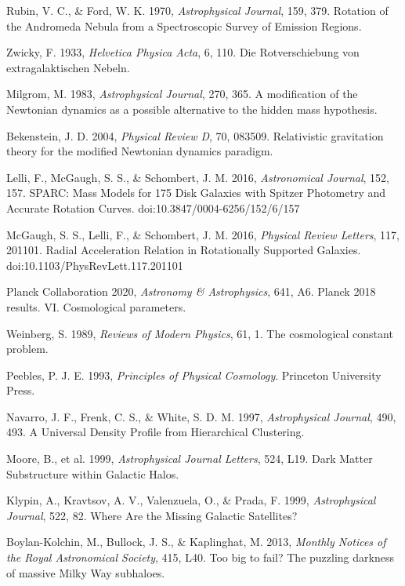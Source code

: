 \documentclass[12pt,a4paper]{article}
\begin{document}
\begin{thebibliography}{99}

 Rubin, V. C., \& Ford, W. K. 1970, \textit{Astrophysical Journal}, 159, 379. Rotation of the Andromeda Nebula from a Spectroscopic Survey of Emission Regions.

 Zwicky, F. 1933, \textit{Helvetica Physica Acta}, 6, 110. Die Rotverschiebung von extragalaktischen Nebeln.

 Milgrom, M. 1983, \textit{Astrophysical Journal}, 270, 365. A modification of the Newtonian dynamics as a possible alternative to the hidden mass hypothesis.

 Bekenstein, J. D. 2004, \textit{Physical Review D}, 70, 083509. Relativistic gravitation theory for the modified Newtonian dynamics paradigm.

 Lelli, F., McGaugh, S. S., \& Schombert, J. M. 2016, \textit{Astronomical Journal}, 152, 157. SPARC: Mass Models for 175 Disk Galaxies with Spitzer Photometry and Accurate Rotation Curves. doi:10.3847/0004-6256/152/6/157

 McGaugh, S. S., Lelli, F., \& Schombert, J. M. 2016, \textit{Physical Review Letters}, 117, 201101. Radial Acceleration Relation in Rotationally Supported Galaxies. doi:10.1103/PhysRevLett.117.201101

 Planck Collaboration 2020, \textit{Astronomy \& Astrophysics}, 641, A6. Planck 2018 results. VI. Cosmological parameters.

 Weinberg, S. 1989, \textit{Reviews of Modern Physics}, 61, 1. The cosmological constant problem.

 Peebles, P. J. E. 1993, \textit{Principles of Physical Cosmology}. Princeton University Press.

 Navarro, J. F., Frenk, C. S., \& White, S. D. M. 1997, \textit{Astrophysical Journal}, 490, 493. A Universal Density Profile from Hierarchical Clustering.

 Moore, B., et al. 1999, \textit{Astrophysical Journal Letters}, 524, L19. Dark Matter Substructure within Galactic Halos.

 Klypin, A., Kravtsov, A. V., Valenzuela, O., \& Prada, F. 1999, \textit{Astrophysical Journal}, 522, 82. Where Are the Missing Galactic Satellites?

 Boylan-Kolchin, M., Bullock, J. S., \& Kaplinghat, M. 2013, \textit{Monthly Notices of the Royal Astronomical Society}, 415, L40. Too big to fail? The puzzling darkness of massive Milky Way subhaloes.


\end{thebibliography}
\end{document}
